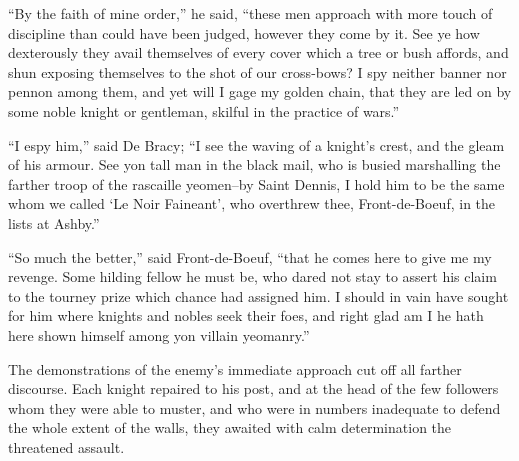 ``By the faith of mine order,'' he said, ``these men approach with more
touch of discipline than could have been judged, however they come by
it. See ye how dexterously they avail themselves of every cover which a
tree or bush affords, and shun exposing themselves to the shot of our
cross-bows? I spy neither banner nor pennon among them, and yet will I
gage my golden chain, that they are led on by some noble knight or
gentleman, skilful in the practice of wars.''

``I espy him,'' said De Bracy; ``I see the waving of a knight's crest,
and the gleam of his armour. See yon tall man in the black mail, who is
busied marshalling the farther troop of the rascaille yeomen--by Saint
Dennis, I hold him to be the same whom we called `Le Noir Faineant', who
overthrew thee, Front-de-Boeuf, in the lists at Ashby.''

``So much the better,'' said Front-de-Boeuf, ``that he comes here to
give me my revenge. Some hilding fellow he must be, who dared not stay
to assert his claim to the tourney prize which chance had assigned him.
I should in vain have sought for him where knights and nobles seek their
foes, and right glad am I he hath here shown himself among yon villain
yeomanry.''

The demonstrations of the enemy's immediate approach cut off all farther
discourse. Each knight repaired to his post, and at the head of the few
followers whom they were able to muster, and who were in numbers
inadequate to defend the whole extent of the walls, they awaited with
calm determination the threatened assault.

